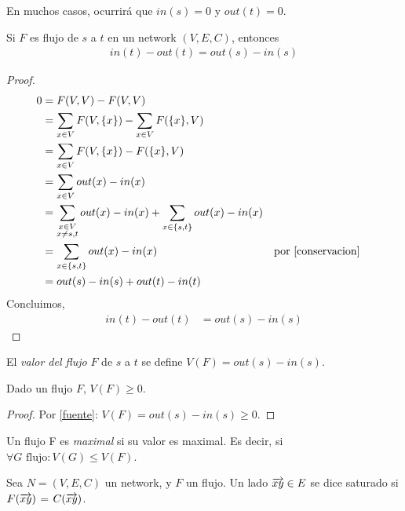 En muchos casos, ocurrirá que $in(s) = 0$ y $out(t) = 0$.

\begin{proposition}
Si $F$ es flujo de $s$ a $t$ en un network $(V, E, C)$, entonces
\begin{align}
    in(t) - out(t) = out(s) - in(s)
\end{align}
\end{proposition}

\begin{proof}
\begin{align}
  0
  &= F(V,V) - F(V,V)\\
  &= \sum_{x \in V} F(V, \{x\}) - \sum_{x\in V} F(\{x\}, V)\\
  &= \sum_{x \in V} F(V, \{x\}) - F(\{x\}, V)\\
  &= \sum_{x \in V} out(x) - in(x)\\
  &= \sum_{\substack{x \in V \\ x \neq s,t}} out(x) - in(x) + \sum_{\substack{x \in \{s,t\}}} out(x) - in(x)\\
  &= \sum_{\substack{x \in \{s,t\}}} out(x) - in(x) &&\text{por \ref{conservacion}}\\
  &= out(s) - in(s) + out(t) - in(t)
\end{align}
Concluimos,
\begin{align}
  in(t) - out(t) &= out(s) - in(s)
\end{align}
\end{proof}

\begin{definition}
  El \emph{valor del flujo} $F$ de $s$ a $t$ se define $V(F) = out(s) - in(s)$.
\end{definition}

\begin{proposition}
  Dado un flujo $F$, $V(F) \ge 0$.
\end{proposition}
\begin{proof}
  Por \ref{fuente}: $V(F) = out(s) - in(s) \ge 0$.
\end{proof}

\begin{definition}
  Un flujo F es \emph{maximal} si su valor es maximal. Es decir, si
  $\forall G\text{ flujo} \colon V(G) \le V(F)$.
\end{definition}

\begin{definition}
  Sea $N = (V,E,C)$ un network, y $F$ un flujo. Un lado $\overrightarrow{xy} \in E$ se dice
  saturado si $F(\overrightarrow{xy})$ = $C(\overrightarrow{xy})$.
\end{definition}

